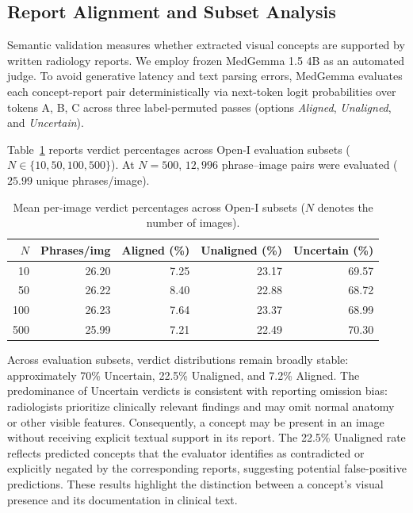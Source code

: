 \subsection{Report Alignment and Subset Analysis}
Semantic validation measures whether extracted visual concepts are supported by written radiology reports. We employ frozen MedGemma 1.5 4B as an automated judge. To avoid generative latency and text parsing errors, MedGemma evaluates each concept-report pair deterministically via next-token logit probabilities over tokens A, B, C across three label-permuted passes (options \emph{Aligned}, \emph{Unaligned}, and \emph{Uncertain}).

Table~\ref{tab:alignment} reports verdict percentages across Open-I evaluation subsets ($N \in \{10, 50, 100, 500\}$). At $N=500$, $12,996$ phrase--image pairs were evaluated ($25.99$ unique phrases/image).

\begin{table}[htbp]
\centering
\caption{Mean per-image verdict percentages across Open-I subsets ($N$ denotes the number of images).}
\label{tab:alignment}
\small
\begin{tabular}{rrrrr}
\toprule
$N$ & Phrases/img & Aligned (\%) & Unaligned (\%) & Uncertain (\%) \\
\midrule
10  & 26.20 & 7.25 & 23.17 & 69.57 \\
50  & 26.22 & 8.40 & 22.88 & 68.72 \\
100 & 26.23 & 7.64 & 23.37 & 68.99 \\
500 & 25.99 & 7.21 & 22.49 & 70.30 \\
\bottomrule
\end{tabular}
\end{table}

Across evaluation subsets, verdict distributions remain broadly stable: approximately 70\% Uncertain, 22.5\% Unaligned, and 7.2\% Aligned. The predominance of Uncertain verdicts is consistent with reporting omission bias: radiologists prioritize clinically relevant findings and may omit normal anatomy or other visible features. Consequently, a concept may be present in an image without receiving explicit textual support in its report. The 22.5\% Unaligned rate reflects predicted concepts that the evaluator identifies as contradicted or explicitly negated by the corresponding reports, suggesting potential false-positive predictions. These results highlight the distinction between a concept’s visual presence and its documentation in clinical text.


